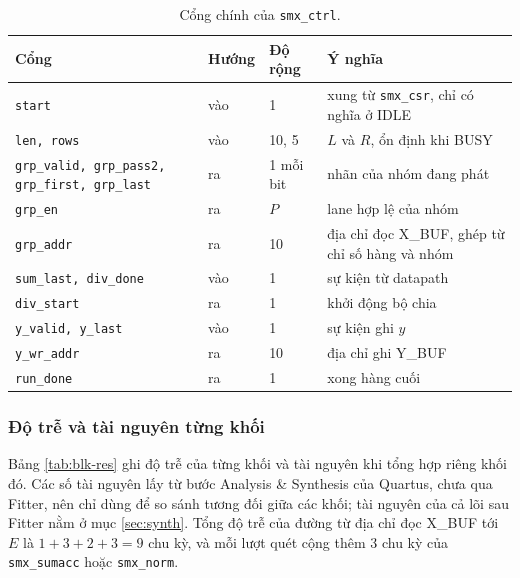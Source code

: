 \begin{table}[htbp]
\centering
\small
\begin{tabular}{p{2.7cm}p{1.2cm}p{1.9cm}p{7.2cm}}
\toprule
Cổng & Hướng & Độ rộng & Ý nghĩa \\
\midrule
\texttt{start} & vào & 1 & xung từ \texttt{smx\_csr}, chỉ có nghĩa ở IDLE \\
\texttt{len, rows} & vào & 10, 5 & $L$ và $R$, ổn định khi BUSY \\
\texttt{grp\_valid, grp\_pass2, grp\_first, grp\_last} & ra & 1 mỗi bit & nhãn của nhóm đang phát \\
\texttt{grp\_en} & ra & $P$ & lane hợp lệ của nhóm \\
\texttt{grp\_addr} & ra & 10 & địa chỉ đọc X\_BUF, ghép từ chỉ số hàng và nhóm \\
\texttt{sum\_last, div\_done} & vào & 1 & sự kiện từ datapath \\
\texttt{div\_start} & ra & 1 & khởi động bộ chia \\
\texttt{y\_valid, y\_last} & vào & 1 & sự kiện ghi $y$ \\
\texttt{y\_wr\_addr} & ra & 10 & địa chỉ ghi Y\_BUF \\
\texttt{run\_done} & ra & 1 & xong hàng cuối \\
\bottomrule
\end{tabular}
\caption{Cổng chính của \texttt{smx\_ctrl}.}
\label{tab:p-ctrl}
\end{table}


\subsubsection{Độ trễ và tài nguyên từng khối}

Bảng \ref{tab:blk-res} ghi độ trễ của từng khối và tài nguyên khi tổng hợp riêng khối đó. Các số tài nguyên lấy từ bước Analysis \& Synthesis của Quartus, chưa qua Fitter, nên chỉ dùng để so sánh tương đối giữa các khối; tài nguyên của cả lõi sau Fitter nằm ở mục \ref{sec:synth}. Tổng độ trễ của đường từ địa chỉ đọc X\_BUF tới $E$ là $1 + 3 + 2 + 3 = 9$ chu kỳ, và mỗi lượt quét cộng thêm 3 chu kỳ của \texttt{smx\_sumacc} hoặc \texttt{smx\_norm}.

